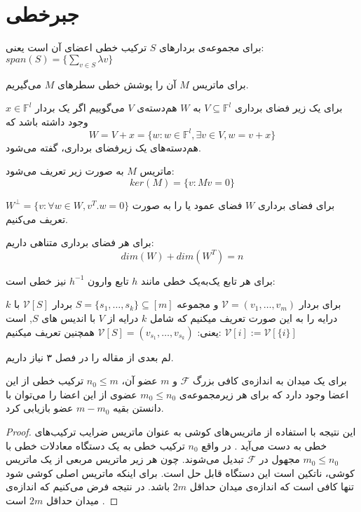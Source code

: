 \section{جبرخطی}
\begin{definition}
	برای مجموعه‌ی بردار‌های
	$S$
	ترکیب خطی اعضای آن است یعنی:
	$span(S) = \{ \sum\limits_{v \in S} \lambda v\}$
	
	برای ماتریس
	$M$
آن را پوشش خطی سطرهای 
$M$
می‌گیریم.
\end{definition}

\begin{definition}[
	همدسته
	]
	برای یک زیر فضای برداری
	$V \subseteq \mathbb{F}^l$
	به
	$W$
	هم‌دسته‌‌‌ی
	$V$
	می‌گوییم اگر یک بردار
	$x \in \mathbb{F}^l$
	وجود داشته باشد که
	$$W = V + x = \{w: w \in \mathbb{F}^l, \exists v \in V, w = v + x\}$$
	هم‌دسته‌های یک زیرفضای برداری،
	گفته می‌شود.
\end{definition}
\begin{definition}[
	هسته
	]
	ماتریس
	$M$
	به صورت زیر تعریف می‌شود:
	$$ker(M) = \{v: Mv = 0\}$$
\end{definition}
برای فضای برداری
$W$
فضای عمود یا
 را به صورت
$W^\bot = \{v: \forall w \in W, v^T.w = 0\}$
تعریف می‌کنیم.

\begin{theorem}
	برای هر فضای برداری متناهی داریم:
	$$dim(W) + dim(W^T) = n$$
\end{theorem}
\begin{remark}
	برای هر تابع یک‌به‌یک خطی مانند
	$h$
	تابع وارون 
	$h^{-1}$
	نیز خطی است:
\end{remark}

برای بردار
$\mathcal{V} = (v_1, \ldots, v_m)$ 
و مجموعه
$S = \{s_1, \ldots, s_k\} \subseteq [m]$
بردار
$\mathcal{V} [S]$ 
با 
$k$
درایه را به این صورت تعریف میکنیم که شامل 
$k$ 
درایه از
$V$ 
با اندیس های
$S$, 
است یعنی:
$\mathcal{V} [S] = (v_{s_1}, \ldots, v_{s_k})$
همچنین تعریف میکنیم:
$\mathcal{V} [i] := \mathcal{V} [{\{i\}}]$

لم بعدی از مقاله
\cite{pliable2015paper}
را در فصل ۳ نیاز داریم.
\begin{lemma}
	\label{lemma:pliable20151}
	برای یک میدان به اندازه‌ی کافی بزرگ
	$\mathcal{F}$
	و
	$m$
	عضو آن،
	$n_0 \leq m$
	ترکیب خطی از این اعضا وجود دارد که برای هر زیرمجموعه‌ی
	$m_0 \leq n_0$
	عضوی از این اعضا را می‌توان با دانستن بقیه
	$m - m_0$
	عضو بازیابی کرد.
\end{lemma}
\begin{proof}
این نتیجه با استفاده از ماتریس‌های کوشی به عنوان ماتریس ضرایب ترکیب‌های خطی به دست می‌آید
\cite{Blmer1995AnXE}
. در واقع
$n_0$
ترکیب خطی به یک دستگاه معادلات خطی با
$m_0 \leq n_0$
مجهول در
$\mathcal{F}$
تبدیل می‌شوند. چون هر زیر ماتریس مربعی از یک ماتریس کوشی، ناتکین است این دستگاه قابل حل است. برای اینکه ماتریس اصلی کوشی شود تنها کافی است که اندازه‌ی میدان حداقل
$2m$
باشد. در نتیجه فرض می‌کنیم که اندازه‌ی میدان حداقل
$2m$
است
\cite{pliable2015paper}.
\end{proof}

